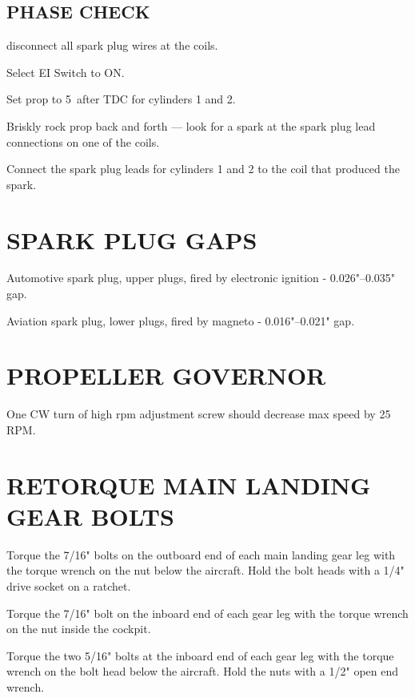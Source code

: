   \subsection{PHASE CHECK} 
  \begin{enumerate*}
  	\item disconnect all spark plug wires at the coils.  
  	\item Select EI Switch to ON.  
  	\item Set prop to 5\textdegree ~after TDC for cylinders 1 and 2.  
  	\item Briskly rock prop back and forth --- look for a spark at the spark plug lead connections on one of the coils.  
  	\item Connect the spark plug leads for cylinders 1 and 2 to the coil that produced the spark.
\end{enumerate*}

\section{SPARK PLUG GAPS}
Automotive spark plug, upper plugs, fired by electronic ignition - 0.026"--0.035" gap.

Aviation spark plug, lower plugs, fired by magneto - 0.016"--0.021" gap.

\section{PROPELLER GOVERNOR}
One CW turn of high rpm adjustment screw should decrease max speed by 25 RPM. 

\section{RETORQUE MAIN LANDING GEAR BOLTS}
  \begin{enumerate*}
    \item Torque the 7/16" bolts on the outboard end of each main landing gear leg with the torque wrench on the nut below the aircraft.  Hold the bolt heads with a 1/4" drive socket on a ratchet. 
    \item Torque the 7/16" bolt on the inboard end of each gear leg with the torque wrench on the nut inside the cockpit.  
    \item Torque the two 5/16" bolts at the inboard end of each gear leg with the torque wrench on the bolt head below the aircraft.  Hold the nuts with a 1/2" open end wrench.  
\end{enumerate*}

